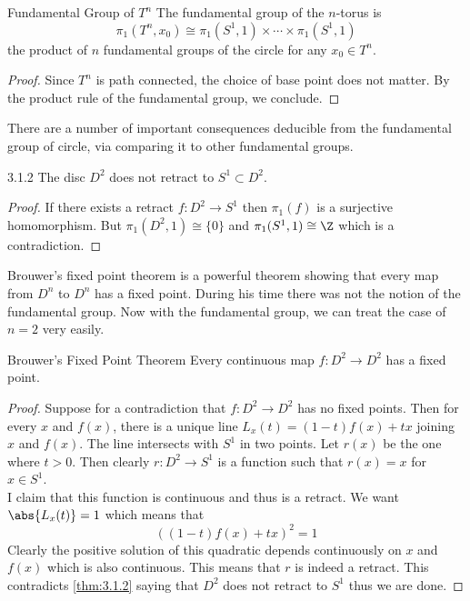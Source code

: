 \documentclass[a4paper]{article}
\begin{document}
\begin{eg}{Fundamental Group of $T^n$}{} The fundamental group of the $n$-torus is $$\pi_1(T^n,x_0)\cong\pi_1(S^1,1)\times\cdots\times\pi_1(S^1,1)$$ the product of $n$ fundamental groups of the circle for any $x_0\in T^n$. 
\begin{proof}
Since $T^n$ is path connected, the choice of base point does not matter. By the product rule of the fundamental group, we conclude. 
\end{proof}
\end{eg}

There are a number of important consequences deducible from the fundamental group of circle, via comparing it to other fundamental groups. 

\begin{prp}{}{3.1.2} The disc $D^2$ does not retract to $S^1\subset D^2$. 
\begin{proof}
If there exists a retract $f:D^2\to S^1$ then $\pi_1(f)$ is a surjective homomorphism. But $\pi_1	(D^2,1)\cong\{0\}$ and $\pi_1(S^1,1)\cong\Z$ which is a contradiction. 
\end{proof}
\end{prp}

Brouwer's fixed point theorem is a powerful theorem showing that every map from $D^n$ to $D^n$ has a fixed point. During his time there was not the notion of the fundamental group. Now with the fundamental group, we can treat the case of $n=2$ very easily. 

\begin{prp}{Brouwer's Fixed Point Theorem}{} Every continuous map $f:D^2\to D^2$ has a fixed point. 
\begin{proof}
Suppose for a contradiction that $f:D^2\to D^2$ has no fixed points. Then for every $x$ and $f(x)$, there is a unique line $L_x(t)=(1-t)f(x)+tx$ joining $x$ and $f(x)$. The line intersects with $S^1$ in two points. Let $r(x)$ be the one where $t>0$. Then clearly $r:D^2\to S^1$ is a function such that $r(x)=x$ for $x\in S^1$. \\
I claim that this function is continuous and thus is a retract. We want $\abs{L_x(t)}=1$ which means that $$((1-t)f(x)+tx)^2=1$$ Clearly the positive solution of this quadratic depends continuously on $x$ and $f(x)$ which is also continuous. This means that $r$ is indeed a retract. This contradicts \ref{thm:3.1.2} saying that $D^2$ does not retract to $S^1$ thus we are done. 
\end{proof}
\end{prp}
\end{document}
